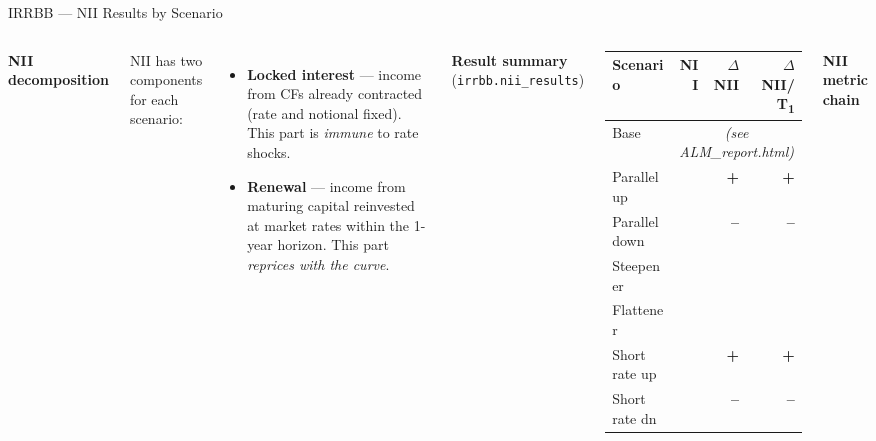 \documentclass[aspectratio=169,10pt]{beamer}
\newcommand{\pos}[1]{\textcolor{labgrn}{\textbf{#1}}}
\newcommand{\neg}[1]{\textcolor{labred}{\textbf{#1}}}
\begin{document}
\begin{frame}{IRRBB — NII Results by Scenario}

  \begin{columns}[T]
      \textbf{NII decomposition}

      \vspace{4pt}
      \small
      NII has two components for each scenario:
      \begin{itemize}
        \item \textbf{Locked interest} — income from CFs already contracted
              (rate and notional fixed). This part is \textit{immune} to
              rate shocks.
        \item \textbf{Renewal} — income from maturing capital reinvested
              at market rates within the 1-year horizon.
              This part \textit{reprices with the curve}.
      \end{itemize}

      \vspace{6pt}
      \normalsize
      \textbf{Result summary} (\texttt{irrbb.nii\_results})

      \vspace{4pt}
      \small
      \begin{tabular}{lrrr}
        \toprule
        \textbf{Scenario} & \textbf{NII} & \textbf{\(\Delta\)NII} & \textbf{\(\Delta\)NII/T\textsubscript{1}} \\
        \midrule
        Base           & \multicolumn{3}{c}{\textit{(see ALM\_report.html)}} \\
        Parallel up    & & \pos{+} & \pos{+} \\
        Parallel down  & & \neg{--} & \neg{--} \\
        Steepener      & & & \\
        Flattener      & & & \\
        Short rate up  & & \pos{+} & \pos{+} \\
        Short rate dn  & & \neg{--} & \neg{--} \\
        \bottomrule
      \end{tabular}

      \textbf{NII metric chain}


\end{columns}
\end{frame}
\end{document}
